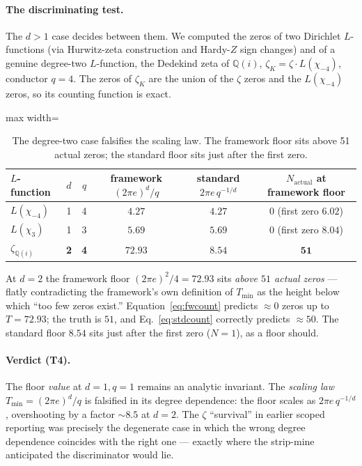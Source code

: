 \documentclass[11pt]{article}
\newcommand{\Tmin}{T_{\min}}
\begin{document}
\paragraph{The discriminating test.} The $d>1$ case decides between them. We computed the
zeros of two Dirichlet $L$-functions (via Hurwitz-zeta construction and Hardy-$Z$ sign
changes) and of a genuine degree-two $L$-function, the Dedekind zeta of $\mathbb{Q}(i)$,
$\zeta_K=\zeta\cdot L(\chi_{-4})$, conductor $q=4$. The zeros of $\zeta_K$ are the union
of the $\zeta$ zeros and the $L(\chi_{-4})$ zeros, so its counting function is exact.

\begin{table}[h]
\centering
\begin{adjustbox}{max width=\linewidth}\begin{tabular}{lccccc}
\toprule
$L$-function & $d$ & $q$ & framework $(2\pi e)^d/q$ & standard $2\pi e\,q^{-1/d}$ & $N_{\text{actual}}$ at framework floor\\
\midrule
$L(\chi_{-4})$ & 1 & 4 & $4.27$ & $4.27$ & $0$ (first zero $6.02$)\\
$L(\chi_{3})$ & 1 & 3 & $5.69$ & $5.69$ & $0$ (first zero $8.04$)\\
$\zeta_{\mathbb{Q}(i)}$ & \textbf{2} & \textbf{4} & $\mathbf{72.93}$ & $\mathbf{8.54}$ & $\mathbf{51}$\\
\bottomrule
\end{tabular}\end{adjustbox}
\caption{The degree-two case falsifies the scaling law. The framework floor sits above
51 actual zeros; the standard floor sits just after the first zero.}
\label{tab:q3}
\end{table}

At $d=2$ the framework floor $(2\pi e)^2/4=72.93$ sits \emph{above $51$ actual zeros} ---
flatly contradicting the framework's own definition of $\Tmin$ as the height below which
``too few zeros exist.'' Equation~\eqref{eq:fwcount} predicts $\approx 0$ zeros up to
$T=72.93$; the truth is $51$, and Eq.~\eqref{eq:stdcount} correctly predicts $\approx
50$. The standard floor $8.54$ sits just after the first zero ($N=1$), as a floor should.

\paragraph{Verdict (T4).} The floor \emph{value} at $d=1,q=1$ remains an analytic
invariant. The \emph{scaling law} $\Tmin=(2\pi e)^d/q$ is falsified in its degree
dependence: the floor scales as $2\pi e\,q^{-1/d}$, overshooting by a factor $\sim 8.5$
at $d=2$. The $\zeta$ ``survival'' in earlier scoped reporting was precisely the
degenerate case in which the wrong degree dependence coincides with the right one ---
exactly where the strip-mine anticipated the discriminator would lie.
\end{document}
